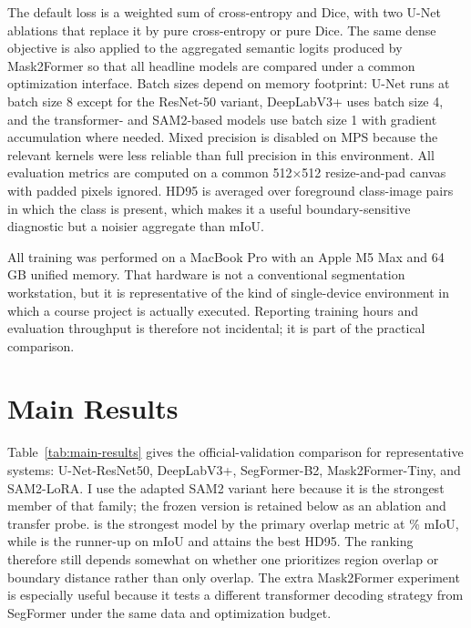 \documentclass{article}
\begin{document}
The default loss is a weighted sum of cross-entropy and Dice, with two U-Net ablations that replace it by pure cross-entropy or pure Dice. The same dense objective is also applied to the aggregated semantic logits produced by Mask2Former so that all headline models are compared under a common optimization interface. Batch sizes depend on memory footprint: U-Net runs at batch size 8 except for the ResNet-50 variant, DeepLabV3+ uses batch size 4, and the transformer- and SAM2-based models use batch size 1 with gradient accumulation where needed. Mixed precision is disabled on MPS because the relevant kernels were less reliable than full precision in this environment. All evaluation metrics are computed on a common \num{512}$\times$\num{512} resize-and-pad canvas with padded pixels ignored. HD95 is averaged over foreground class-image pairs in which the class is present, which makes it a useful boundary-sensitive diagnostic but a noisier aggregate than mIoU.

All training was performed on a MacBook Pro with an Apple M5 Max and 64 GB unified memory. That hardware is not a conventional segmentation workstation, but it is representative of the kind of single-device environment in which a course project is actually executed. Reporting training hours and evaluation throughput is therefore not incidental; it is part of the practical comparison.

\section{Main Results}

Table~\ref{tab:main-results} gives the official-validation comparison for \HeadlineModelCount{} representative systems: U-Net-ResNet50, DeepLabV3+, SegFormer-B2, Mask2Former-Tiny, and SAM2-LoRA. I use the adapted SAM2 variant here because it is the strongest member of that family; the frozen version is retained below as an ablation and transfer probe. \TopModelName{} is the strongest model by the primary overlap metric at \TopModelMiou{}\% mIoU, while \RunnerUpName{} is the runner-up on mIoU and \BestHdModelName{} attains the best HD95. The ranking therefore still depends somewhat on whether one prioritizes region overlap or boundary distance rather than only overlap. The extra Mask2Former experiment is especially useful because it tests a different transformer decoding strategy from SegFormer under the same data and optimization budget.

\begin{table}[H]
  \centering
  \small
  \caption{Official-validation results for the headline systems. All metrics are computed on the locked VOC 2007 validation split. mIoU is the primary ranking metric; HD95 is a secondary boundary diagnostic computed on the common \num{512}$\times$\num{512} evaluation canvas and averaged over foreground class-image pairs.}
  \label{tab:main-results}
  
\end{table}
\end{document}

